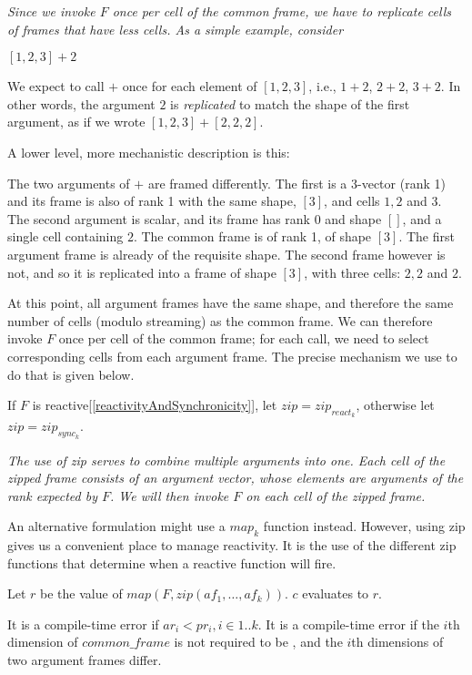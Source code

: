 \documentclass{article}
\begin{document}
{\em
Since we invoke $F$ once per cell of the common frame, we have to replicate cells of frames that have less cells.
As a simple example, consider

$[1, 2, 3] + 2$

We expect to call $+$ once for each element of $[1, 2, 3]$, i.e., $1+2$, $2+2$, $3+2$. In other words, the argument $2$ is {\em replicated} to match the shape of the first argument, as if we wrote $[1, 2, 3] + [2, 2, 2]$.

A lower level, more mechanistic  description is this:

The two arguments of $+$ are framed differently. The first is a 3-vector (rank 1) and its frame is also of rank 1 with the same shape, $[3]$, and cells $1, 2$ and $3$.
The second argument is  scalar,  and its frame has rank 0 and shape $[]$, and a single cell containing $2$. The common frame is of rank 1, of shape $[3]$. The first argument frame is already of the requisite shape. The second frame however is not, and so it is replicated into a frame of shape $[3]$, with three cells: $2, 2$ and $2$.

At this point, all argument frames have the same shape, and therefore the same number of cells (modulo streaming) as the common frame. We can therefore invoke $F$ once per cell of the common frame;  for each call, we need to select corresponding cells from each argument frame. The precise mechanism we use to do that is given below. 
}

If $F$ is reactive[\ref{reactivityAndSynchronicity}], let $zip = zip_{react_k}$, otherwise let $zip = zip_{sync_k}$.

{\em
The use of zip serves to combine multiple arguments into one.  
Each cell of the zipped frame consists of an argument vector, whose elements are arguments of the rank expected by $F$.
We will then invoke $F$ on each cell of the zipped frame.

An alternative formulation might use a $map_k$ function instead.
However, using zip gives us a convenient place to manage reactivity.
It is the use of the different zip functions that determine when a reactive function will fire. 
}

Let $r$ be the value of $map(F, zip(af_1, \ldots, af_k))$. $c$ evaluates to $r$.

It is a compile-time error if $ar_i < pr_i, i \in 1..k$. It is a compile-time error if the $i$th dimension of  $common\_frame$ is not required to be  \QUESTIONMARK{}, and the $i$th dimensions of two argument frames differ. 
\end{document}
